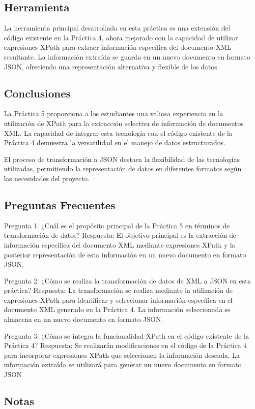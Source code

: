 \subsection{Herramienta}

La herramienta principal desarrollada en esta práctica es una extensión del código existente en la Práctica 4, ahora mejorado con la capacidad de utilizar expresiones XPath para extraer información específica del documento XML resultante. La información extraída se guarda en un nuevo documento en formato JSON, ofreciendo una representación alternativa y flexible de los datos.

\subsection{Conclusiones}

La Práctica 5 proporciona a los estudiantes una valiosa experiencia en la utilización de XPath para la extracción selectiva de información de documentos XML. La capacidad de integrar esta tecnología con el código existente de la Práctica 4 demuestra la versatilidad en el manejo de datos estructurados.

El proceso de transformación a JSON destaca la flexibilidad de las tecnologías utilizadas, permitiendo la representación de datos en diferentes formatos según las necesidades del proyecto.

\subsection{Preguntas Frecuentes}

Pregunta 1: ¿Cuál es el propósito principal de la Práctica 5 en términos de transformación de datos?
Respuesta: El objetivo principal es la extracción de información específica del documento XML mediante expresiones XPath y la posterior representación de esta información en un nuevo documento en formato JSON.

Pregunta 2: ¿Cómo se realiza la transformación de datos de XML a JSON en esta práctica?
Respuesta: La transformación se realiza mediante la utilización de expresiones XPath para identificar y seleccionar información específica en el documento XML generado en la Práctica 4. La información seleccionada se almacena en un nuevo documento en formato JSON.

Pregunta 3: ¿Cómo se integra la funcionalidad XPath en el código existente de la Práctica 4?
Respuesta: Se realizarán modificaciones en el código de la Práctica 4 para incorporar expresiones XPath que seleccionen la información deseada. La información extraída se utilizará para generar un nuevo documento en formato JSON

\subsection{Notas}